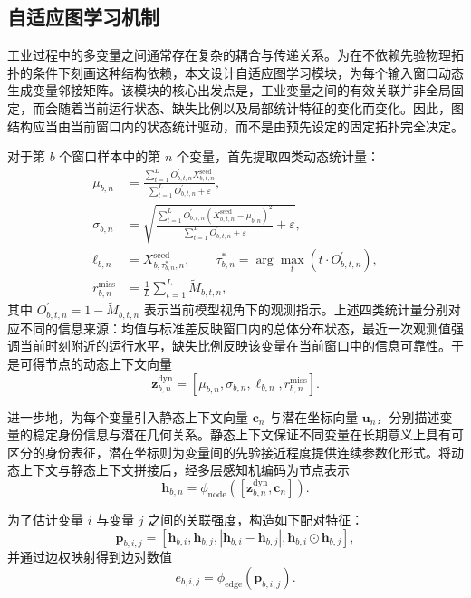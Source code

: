 \subsection{自适应图学习机制}

工业过程中的多变量之间通常存在复杂的耦合与传递关系。为在不依赖先验物理拓扑的条件下刻画这种结构依赖，本文设计自适应图学习模块，为每个输入窗口动态生成变量邻接矩阵。该模块的核心出发点是，工业变量之间的有效关联并非全局固定，而会随着当前运行状态、缺失比例以及局部统计特征的变化而变化。因此，图结构应当由当前窗口内的状态统计驱动，而不是由预先设定的固定拓扑完全决定。

对于第 $b$ 个窗口样本中的第 $n$ 个变量，首先提取四类动态统计量：
\begin{align}
    \mu_{b,n} &= \frac{\sum_{t=1}^{L} O_{b,t,n}^{\prime} X_{b,t,n}^{\mathrm{seed}}}{\sum_{t=1}^{L} O_{b,t,n}^{\prime} + \varepsilon}, \\
    \sigma_{b,n} &= \sqrt{\frac{\sum_{t=1}^{L} O_{b,t,n}^{\prime} \left(X_{b,t,n}^{\mathrm{seed}}-\mu_{b,n}\right)^2}{\sum_{t=1}^{L} O_{b,t,n}^{\prime} + \varepsilon} + \varepsilon}, \\
    \ell_{b,n} &= X_{b,\tau_{b,n}^{\ast},n}^{\mathrm{seed}}, \qquad \tau_{b,n}^{\ast} = \arg\max_t \left(t \cdot O_{b,t,n}^{\prime}\right), \\
    r_{b,n}^{\mathrm{miss}} &= \frac{1}{L}\sum_{t=1}^{L} \widetilde{M}_{b,t,n},
\end{align}
其中 $O_{b,t,n}^{\prime}=1-\widetilde{M}_{b,t,n}$ 表示当前模型视角下的观测指示。上述四类统计量分别对应不同的信息来源：均值与标准差反映窗口内的总体分布状态，最近一次观测值强调当前时刻附近的运行水平，缺失比例反映该变量在当前窗口中的信息可靠性。于是可得节点的动态上下文向量
\begin{equation}
    \mathbf{z}_{b,n}^{\mathrm{dyn}} =
    [\mu_{b,n},\sigma_{b,n},\ell_{b,n},r_{b,n}^{\mathrm{miss}}].
\end{equation}

进一步地，为每个变量引入静态上下文向量 $\mathbf{c}_n$ 与潜在坐标向量 $\mathbf{u}_n$，分别描述变量的稳定身份信息与潜在几何关系。静态上下文保证不同变量在长期意义上具有可区分的身份表征，潜在坐标则为变量间的先验接近程度提供连续参数化形式。将动态上下文与静态上下文拼接后，经多层感知机编码为节点表示
\begin{equation}
    \mathbf{h}_{b,n} = \phi_{\mathrm{node}}\!\left([\mathbf{z}_{b,n}^{\mathrm{dyn}},\mathbf{c}_n]\right).
\end{equation}

为了估计变量 $i$ 与变量 $j$ 之间的关联强度，构造如下配对特征：
\begin{equation}
    \mathbf{p}_{b,i,j} =
    [\mathbf{h}_{b,i},\mathbf{h}_{b,j},|\mathbf{h}_{b,i}-\mathbf{h}_{b,j}|,\mathbf{h}_{b,i}\odot\mathbf{h}_{b,j}],
\end{equation}
并通过边权映射得到边对数值
\begin{equation}
    e_{b,i,j} = \phi_{\mathrm{edge}}(\mathbf{p}_{b,i,j}).
\end{equation}

